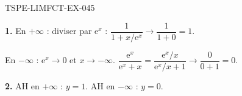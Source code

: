 \begin{corrige}{TSPE-LIMFCT-EX-045}

\textbf{1.} En $+\infty$ : diviser par $\mathrm{e}^x$ : $\dfrac{1}{1+x/\mathrm{e}^x} \to \dfrac{1}{1+0} = \boxed{1}$.

En $-\infty$ : $\mathrm{e}^x \to 0$ et $x \to -\infty$. $\dfrac{\mathrm{e}^x}{\mathrm{e}^x + x} = \dfrac{\mathrm{e}^x/x}{\mathrm{e}^x/x + 1} \to \dfrac{0}{0+1} = \boxed{0}$.

\textbf{2.} AH en $+\infty$ : $y = 1$. AH en $-\infty$ : $y = 0$.

\end{corrige}
